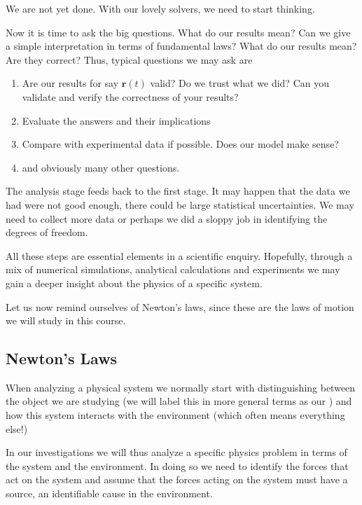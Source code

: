 \documentclass[letterpaper,10pt,english]{sphinxmanual}
\begin{document}
We are not yet done. With our lovely solvers, we need to start thinking.

Now it is time to ask the big questions. What do our results mean? Can we give a simple interpretation in terms of fundamental laws?  What do our results mean? Are they correct?
Thus, typical questions we may ask are
\begin{enumerate}
%
\item {} 
Are our results for say \(\boldsymbol{r}(t)\) valid?  Do we trust what we did?  Can you validate and verify the correctness of your results?

\item {} 
Evaluate the answers and their implications

\item {} 
Compare with experimental data if possible. Does our model make sense?

\item {} 
and obviously many other questions.

\end{enumerate}

The analysis stage feeds back to the first stage. It may happen that
the data we had were not good enough, there could be large statistical
uncertainties. We may need to collect more data or perhaps we did a
sloppy job in identifying the degrees of freedom.

All these steps are essential elements in a scientific
enquiry. Hopefully, through a mix of numerical simulations, analytical
calculations and experiments we may gain a deeper insight about the
physics of a specific system.

Let us now remind ourselves of Newton’s laws, since these are the laws of motion we will study in this course.


\subsection{Newton’s Laws}
\label{\detokenize{chapter3:newton-s-laws}}
When analyzing a physical system we normally start with distinguishing between the object we are studying (we will label this in more general terms as our ) and how this system interacts with the environment (which often means everything else!)

In our investigations we will thus analyze a specific physics problem in terms of the system and the environment.
In doing so we need to identify the forces that act on the system and assume that the
forces acting on the system must have a source, an identifiable cause in
the environment.
\end{document}
